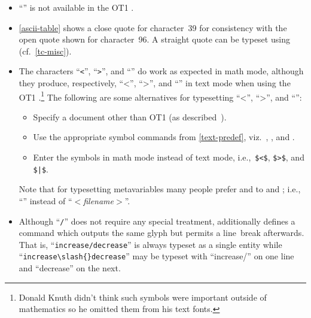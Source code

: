 \begin{itemize}
  \item
  ``\indexcommand[\string\encone{\string\textquotedbl}]{\textquotedbl}{\encone{\textquotedbl}}''
  is not available in the OT1 \fntenc[OT1].

  \item \ref{ascii-table} shows a close quote for character~39 for
    consistency with the open quote shown for character~96.  A
    straight quote can be typeset using 
    (cf.~\ref{tc-misc}).

  \item
  The\label{upside-down} characters ``\texttt{<}'', ``\texttt{>}'', and
  ``\texttt{\textbar}'' do work as expected in math mode, although they
  produce, respectively, ``<'', ``>'', and ``\textbar'' in text mode when
  using the OT1 \fntenc[OT1].\footnote{Donald
  Knuth didn't think such symbols were important outside of
  mathematics so he omitted them from his text fonts.} The following
  are some alternatives for typesetting ``\textless'',
  ``\textgreater'', and ``\textbar'':

  \begin{itemize}
    \item Specify a document \fntenc{} other than OT1 (as
    described~).

    \item Use the appropriate symbol commands from
    \vref{text-predef}, viz.~,
    , and .

    \item Enter the symbols in math mode instead of text mode,
    i.e.,~\verb+$<$+, \verb+$>$+, and \verb+$|$+.
  \end{itemize}

  \noindent
  Note that for typesetting metavariables many people prefer
   and  to  and
  ; i.e., ``'' instead of
  ``$<$\textit{filename}$>$''.

  \item Although ``\texttt{/}'' does not require any special
  treatment, \latex additionally defines a  command which
  outputs the same glyph but permits a line~break afterwards.  That
  is, ``\texttt{increase/decrease}'' is always typeset as a single
  entity while ``\verb|increase\slash{}decrease|'' may be typeset with
  ``increase/'' on one line and ``decrease'' on the next.


\end{itemize}
